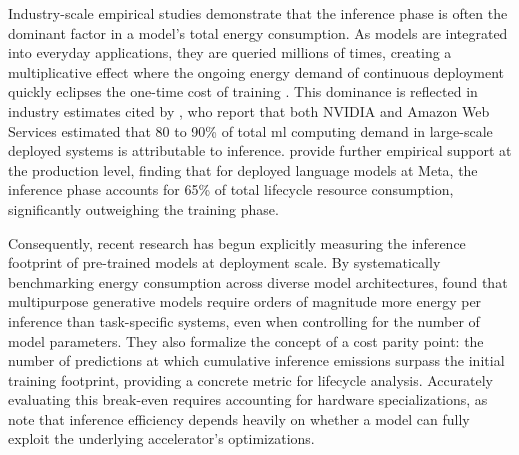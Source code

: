 Industry-scale empirical studies demonstrate that the inference phase is often the dominant factor in a model's total energy consumption. As models are integrated into everyday applications, they are queried millions of times, creating a multiplicative effect where the ongoing energy demand of continuous deployment quickly eclipses the one-time cost of training \cite{desislavovTrendsAIInference2023}. This dominance is reflected in industry estimates cited by \citeauthor{pattersonCarbonEmissionsLarge2021} \cite{pattersonCarbonEmissionsLarge2021}, who report that both NVIDIA and Amazon Web Services estimated that 80 to 90\% of total \gls{ml} computing demand in large-scale deployed systems is attributable to inference. \citeauthor{wuSustainableAIEnvironmental2022} \cite{wuSustainableAIEnvironmental2022} provide further empirical support at the production level, finding that for deployed language models at Meta, the inference phase accounts for 65\% of total lifecycle resource consumption, significantly outweighing the training phase.

Consequently, recent research has begun explicitly measuring the inference footprint of pre-trained models at deployment scale. By systematically benchmarking energy consumption across diverse model architectures, \citeauthor{luccioniPowerHungryProcessing2024} \cite{luccioniPowerHungryProcessing2024} found that multipurpose generative models require orders of magnitude more energy per inference than task-specific systems, even when controlling for the number of model parameters. They also formalize the concept of a cost parity point: the number of predictions at which cumulative inference emissions surpass the initial training footprint, providing a concrete metric for lifecycle analysis. Accurately evaluating this break-even requires accounting for hardware specializations, as \citeauthor{desislavovTrendsAIInference2023} \cite{desislavovTrendsAIInference2023} note that inference efficiency depends heavily on whether a model can fully exploit the underlying accelerator's optimizations.

